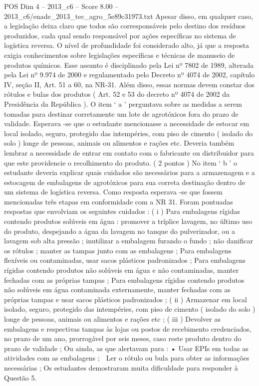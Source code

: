 \begin{textsample}{POS Dim 4 – 2013\_c6 – Score 8.00 – 2013\_c6/enade\_2013\_tec\_agro\_5e89c31973.txt}
Apesar disso, em qualquer caso, a legislação deixa claro que todos são corresponsáveis pelo destino dos resíduos produzidos, cada qual sendo responsável por ações específicas no sistema de logística reversa.
O nível de profundidade foi considerado alto, já que a resposta exigia conhecimentos sobre legislações específicas e técnicas de manuseio de produtos químicos.
Esse assunto é disciplinado pela Lei nº 7802 de 1989, alterada pela Lei nº 9.974 de 2000 e regulamentado pelo Decreto nº 4074 de 2002, capítulo IV, seção II, Art. 51 a 60, na NR-31.
Além disso, essas normas devem constar dos rótulos e bulas dos produtos ( Art. 52 e 53 do decreto nº 4074 de 2002 da Presidência da República ).
O item ‘ a ’ perguntava sobre as medidas a serem tomadas para destinar corretamente um lote de agrotóxicos fora do prazo de validade.
Esperava -se que o estudante mencionasse a necessidade de estocar em local isolado, seguro, protegido das intempéries, com piso de cimento ( isolado do solo ) longe de pessoas, animais ou alimentos e rações etc.
Deveria também lembrar a necessidade de entrar em contato com o fabricante ou distribuidor para que este providencie o recolhimento do produto. ( 2 pontos ) No item ‘ b ’ o estudante deveria explicar quais cuidados são necessários para a armazenagem e a estocagem de embalagens de agrotóxicos para sua correta destinação dentro de um sistema de logística reversa.
Como resposta esperava -se que fossem mencionadas três etapas em conformidade com a NR 31.
Foram pontuadas respostas que envolviam os seguintes cuidados : ( i ) Para embalagens rígidas contendo produtos solúveis em água : promover a tríplice lavagem, no último uso do produto, despejando a água da lavagem no tanque do pulverizador, ou a lavagem sob alta pressão ; inutilizar a embalagem furando o fundo ; não danificar os rótulos ; manter as tampas junto com as embalagens ; Para embalagens flexíveis ou contaminadas, usar sacos plásticos padronizados ; Para embalagens rígidas contendo produtos não solúveis em água e não contaminadas, manter fechadas com as próprias tampas ; Para embalagens rígidas contendo produtos não solúveis em água contaminada externamente, manter fechadas com as próprias tampas e usar sacos plásticos padronizados ; ( ii ) Armazenar em local isolado, seguro, protegido das intempéries, com piso de cimento ( isolado do solo ) longe de pessoas, animais ou alimentos e rações etc ; ( iii ) Devolver as embalagens e respectivas tampas às lojas ou postos de recebimento credenciados, no prazo de um ano, prorrogável por seis meses, caso reste produto dentro do prazo de validade ; Ou ainda, as que alertavam para : • Usar EPIs em todas as atividades com as embalagens ;  Ler o rótulo ou bula para obter as informações necessárias ; Os estudantes demostraram muita dificuldade para responder à Questão 5.

\end{textsample}
